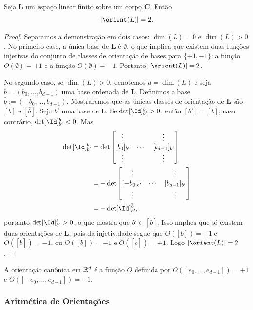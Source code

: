\begin{prop}
Seja $\bm L$ um espaço linear finito sobre um corpo $\bm C$. Então
	\begin{equation*}
	\card{\orient(L)} = 2.
	\end{equation*}
\end{prop}
\begin{proof}
Separamos a demonstração em dois casos: $\dim(L)=0$ e $\dim(L)>0$. No primeiro caso, a única base de $\bm L$ é $\emptyset$, o que implica que existem duas funções injetivas do conjunto de classes de orientação de bases para $\{+1,-1\}$: a função $O(\emptyset) = +1$ e a função $O(\emptyset) = -1$. Portanto $\card{\orient(L)}=2$.

No segundo caso, se $\dim(L)>0$, denotemos $d = \dim(L)$ e seja $b = (b_0,\ldots,b_{d-1})$ uma base ordenada de $\bm L$. Definimos a base $\bar b := (-b_0,\ldots,b_{d-1})$. Mostraremos que as únicas classes de orientação de $\bm L$ são $[b]$ e $[\bar b]$. Seja $b'$ uma base de $\bm L$. Se $\det [\Id]^b_{b'} > 0$, então $[b'] = [b]$; caso contrário, $\det [\Id]^b_{b'} < 0$. Mas
	\begin{align*}
	\det [\Id]^b_{b'} &= \det \begin{bmatrix}
	\vdots &   & \vdots \\ 
	[b_0]_{b'} & \cdots & [b_{d-1}]_{b'} \\ 
	\vdots &   & \vdots
	\end{bmatrix} \\
	&=	- \det \begin{bmatrix}
	\vdots &   & \vdots \\ 
	[-b_0]_{b'} & \cdots & [b_{d-1}]_{b'} \\ 
	\vdots &   & \vdots
	\end{bmatrix} \\
	&= -\det [\Id]^{\bar b}_{b'},
	\end{align*}
portanto $\det  [\Id]^{\bar b}_{b'} > 0$, o que mostra que $b' \in [\bar b]$. Isso implica que só existem duas orientações de $\bm L$, pois da injetividade segue que $O([b])=+1$ e $O([\bar b])=-1$, ou $O([b])=-1$ e $O([\bar b])=+1$. Logo $\card{\orient(L)}=2$.
\end{proof}

A orientação canônica em $\mathbb{R}^d$ é a função $O$ definida por $O([e_0,\ldots,e_{d-1}]) = +1$ e $O([-e_0,\ldots,e_{d-1}]) = -1$.

\subsubsection{Aritmética de Orientações}

